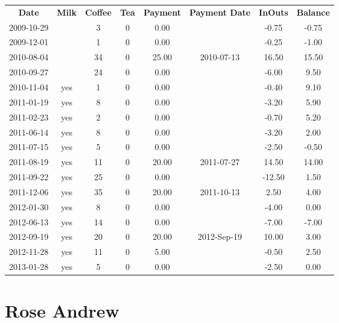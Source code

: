 \begin{center}
\begin{tabular}{cccccccc}
\textbf{Date} & \textbf{Milk} & \textbf{Coffee} & \textbf{Tea} & \textbf{Payment} & \textbf{Payment Date} & \textbf{InOuts} & \textbf{Balance} \\
2009-10-29 &  &  3 & 0 &  0.00 &  &  -0.75 & -0.75\\ 
2009-12-01 &  &  1 & 0 &  0.00 &  &  -0.25 & -1.00\\ 
2010-08-04 &  & 34 & 0 & 25.00 & 2010-07-13 &  16.50 & 15.50\\ 
2010-09-27 &  & 24 & 0 &  0.00 &  &  -6.00 &  9.50\\ 
2010-11-04 & yes &  1 & 0 &  0.00 &  &  -0.40 &  9.10\\ 
2011-01-19 & yes &  8 & 0 &  0.00 &  &  -3.20 &  5.90\\ 
2011-02-23 & yes &  2 & 0 &  0.00 &  &  -0.70 &  5.20\\ 
2011-06-14 & yes &  8 & 0 &  0.00 &  &  -3.20 &  2.00\\ 
2011-07-15 & yes &  5 & 0 &  0.00 &  &  -2.50 & -0.50\\ 
2011-08-19 & yes & 11 & 0 & 20.00 & 2011-07-27 &  14.50 & 14.00\\ 
2011-09-22 & yes & 25 & 0 &  0.00 &  & -12.50 &  1.50\\ 
2011-12-06 & yes & 35 & 0 & 20.00 & 2011-10-13 &   2.50 &  4.00\\ 
2012-01-30 & yes &  8 & 0 &  0.00 &  &  -4.00 &  0.00\\ 
2012-06-13 & yes & 14 & 0 &  0.00 &  &  -7.00 & -7.00\\ 
2012-09-19 & yes & 20 & 0 & 20.00 & 2012-Sep-19 &  10.00 &  3.00\\ 
2012-11-28 & yes & 11 & 0 &  5.00 &  &  -0.50 &  2.50\\ 
2013-01-28 & yes &  5 & 0 &  0.00 &  &  -2.50 &  0.00
\end{tabular}
\end{center}

\section{Rose Andrew}

